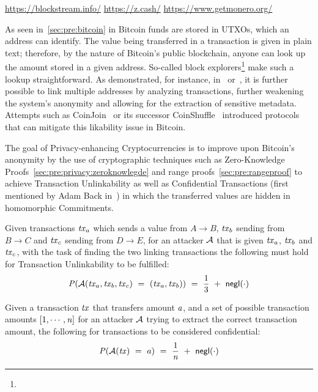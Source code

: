 \urldef\urlblockexp\url{https://blockstream.info/}
\urldef\urlzcash\url{https://z.cash/}
\urldef\urlmonero\url{https://www.getmonero.org/}

As seen in~\cref{sec:pre:bitcoin} in Bitcoin funds are stored in UTXOs, which an address can identify.
The value being transferred in a transaction is given in plain text; therefore, by the nature of Bitcoin’s public blockchain, anyone can look up the amount stored in a given address.
So-called block explorers\footnote{\urlblockexp} make such a lookup straightforward.
As demonstrated, for instance, in~\cite{barber2012bitter} or~\cite{reid2013analysis}, it is further possible to link multiple addresses by analyzing transactions, further weakening the system's anonymity and allowing for the extraction of sensitive metadata.
Attempts such as CoinJoin~\cite{maxwell2013coinjoin} or its successor CoinShuffle~\cite{ruffing2014coinshuffle} introduced protocols that can mitigate this likability issue in Bitcoin.

The goal of Privacy-enhancing Cryptocurrencies is to improve upon Bitcoin's anonymity by the use of cryptographic techniques such as Zero-Knowledge Proofs~\cref{sec:pre:privacy:zeroknowlegde} and range proofs~\cref{sec:pre:rangeproof} to achieve Transaction Unlinkability as well as Confidential Transactions (first mentioned by Adam Back in~\cite{back2013confidentialtx}) in which the transferred values are hidden in homomorphic Commitments.

\begin{definition} \label{def:pre:privacy:tx-unlink}
    Given transactions $\mathit{tx}_a$ which sends a value from $A \rightarrow B$, $\mathit{tx}_b$ sending from $B \rightarrow C$ and $\mathit{tx}_c$ sending from $D \rightarrow E$, for an attacker $\mathcal{A}$ that is given $\mathit{tx}_a$, $\mathit{tx}_b$ and $\mathit{tx}_c$, with the task of finding the two linking transactions the following must hold for Transaction Unlinkability to be fulfilled:
    \[ \mathit{P}(\mathcal{A}(\mathit{tx}_a, \mathit{tx}_b, \mathit{tx}_c) ~=~ (\mathit{tx}_a, \mathit{tx}_b)) ~=~ \frac{1}{3} ~+~ \mathsf{negl}(\cdot)\]
\end{definition}

\begin{definition} \label{def:pre:privacy:conf-tx}
    Given a transaction $\mathit{tx}$ that transfers amount $a$, and a set of possible transaction amounts $[1,\cdots,\mathit{n}]$ for an attacker $\mathcal{A}$ trying to extract the correct transaction amount, the following for transactions to be considered confidential:
    \[ \mathit{P}(\mathcal{A}(\mathit{tx}) ~=~ a) ~=~ \frac{1}{\mathit{n}} ~+~ \mathsf{negl}(\cdot) \]
\end{definition}

